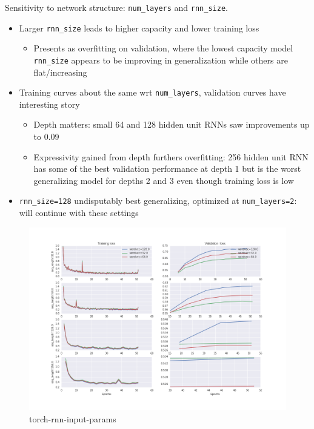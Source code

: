 \documentclass[dissertation.tex]{subfiles}
\begin{document}
Sensitivity to network structure: \texttt{num\_layers} and \texttt{rnn\_size}.
\begin{itemize}
    \item Larger \texttt{rnn\_size} leads to higher capacity and lower training loss
        \begin{itemize}
            \item Presents as overfitting on validation, where the lowest capacity
                model \texttt{rnn\_size} appears to be improving in generalization while
                others are flat/increasing
        \end{itemize}
    \item Training curves about the same wrt \texttt{num\_layers}, validation curves have interesting story
        \begin{itemize}
            \item Depth matters: small 64 and 128 hidden unit RNNs saw improvements up to 0.09
            \item Expressivity gained from depth furthers overfitting: 256
                hidden unit RNN has some of the best validation performance at
                depth 1 but is the worst generalizing model for depths 2
                and 3 even though training loss is low
        \end{itemize}
    \item \texttt{rnn\_size=128} undisputably best generalizing, optimized at
        \texttt{num\_layers=2}: will continue with these settings
\end{itemize}

\begin{figure}[htpb]
    \centering
    \includegraphics[width=\linewidth]{Figures/torch-rnn-input-params.png}
    \caption{torch-rnn-input-params}
    \label{fig:torch-rnn-input-params}
\end{figure}
\end{document}
